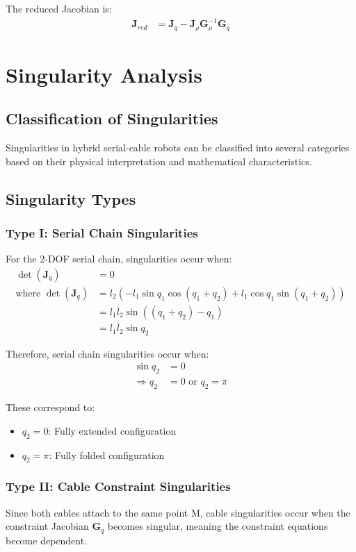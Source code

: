 \documentclass[11pt,a4paper]{article}
\begin{document}
The reduced Jacobian is:
\begin{align}
\bm{J}_{red} &= \bm{J}_q - \bm{J}_{\rho} \bm{G}_{\rho}^{-1} \bm{G}_q
\end{align}

\section{Singularity Analysis}

\subsection{Classification of Singularities}
Singularities in hybrid serial-cable robots can be classified into several categories based on their physical interpretation and mathematical characteristics.

\subsection{Singularity Types}

\subsubsection{Type I: Serial Chain Singularities}
For the 2-DOF serial chain, singularities occur when:
\begin{align}
\det(\bm{J}_q) &= 0 \\
\text{where } \det(\bm{J}_q) &= l_2(-l_1 \sin q_1 \cos(q_1 + q_2) + l_1 \cos q_1 \sin(q_1 + q_2)) \\
&= l_1 l_2 \sin((q_1 + q_2) - q_1) \\
&= l_1 l_2 \sin q_2
\end{align}

Therefore, serial chain singularities occur when:
\begin{align}
\sin q_2 &= 0 \\
\Rightarrow q_2 &= 0 \text{ or } q_2 = \pi
\end{align}

These correspond to:
\begin{itemize}
    \item $q_2 = 0$: Fully extended configuration
    \item $q_2 = \pi$: Fully folded configuration  
\end{itemize}

\subsubsection{Type II: Cable Constraint Singularities}
Since both cables attach to the same point M, cable singularities occur when the constraint Jacobian $\bm{G}_q$ becomes singular, meaning the constraint equations become dependent.
\end{document}
